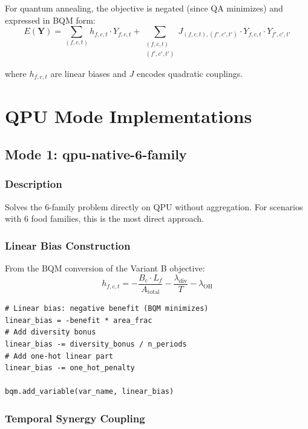 \documentclass[11pt,a4paper]{article}
\begin{document}
For quantum annealing, the objective is negated (since QA minimizes) and expressed in BQM form:
\begin{equation}
E(\mathbf{Y}) = \sum_{(f,c,t)} h_{f,c,t} \cdot Y_{f,c,t} + \sum_{\substack{(f,c,t) \\ (f',c',t')}} J_{(f,c,t),(f',c',t')} \cdot Y_{f,c,t} \cdot Y_{f',c',t'}
\end{equation}

where $h_{f,c,t}$ are linear biases and $J$ encodes quadratic couplings.

\section{QPU Mode Implementations}

\subsection{Mode 1: qpu-native-6-family}

\subsubsection{Description}
Solves the 6-family problem directly on QPU without aggregation. For scenarios with 6 food families, this is the most direct approach.

\subsubsection{Linear Bias Construction}

From the BQM conversion of the Variant B objective:
\begin{equation}
h_{f,c,t} = -\frac{B_c \cdot L_f}{A_{\text{total}}} - \frac{\lambda_{\text{div}}}{T} - \lambda_{\text{OH}}
\end{equation}

\begin{lstlisting}[caption={Linear Bias Implementation}]
# Linear bias: negative benefit (BQM minimizes)
linear_bias = -benefit * area_frac
# Add diversity bonus
linear_bias -= diversity_bonus / n_periods
# Add one-hot linear part
linear_bias -= one_hot_penalty

bqm.add_variable(var_name, linear_bias)
\end{lstlisting}

\subsubsection{Temporal Synergy Coupling}
\end{document}
